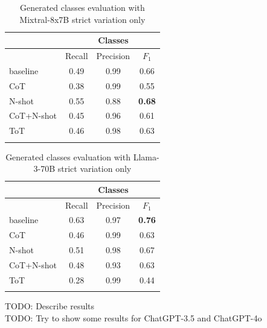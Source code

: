 \begin{table}[!h]
    \scriptsize
    \centering
    \setlength{\tabcolsep}{0.5em}
    \begin{tabular}{lccc}
    \toprule
         & & Classes & \\
     \toprule
         & Recall & Precision & $F_1$ \\
    \toprule
    
    \addlinespace
         baseline    & 0.49 & 0.99 & 0.66 \\
    	 CoT         & 0.38 & 0.99 & 0.55 \\
         N-shot      & 0.55 & 0.88 & \textbf{0.68} \\
         CoT+N-shot  & 0.45 & 0.96 & 0.61 \\
         ToT         & 0.46 & 0.98 & 0.63 \\
    \addlinespace
    \bottomrule
    \addlinespace
    \end{tabular}
    \caption{Generated classes evaluation with Mixtral-8x7B strict variation only}
    \label{tab:mixtral-classes}
\end{table}


\begin{table}[!h]
    \scriptsize
    \centering
    \setlength{\tabcolsep}{0.5em}
    \begin{tabular}{lccc}
    \toprule
    & & Classes & \\
    \toprule
         & Recall & Precision & $F_1$ \\
    \toprule
    
    \addlinespace
         baseline    & 0.63 & 0.97 & \textbf{0.76} \\
    	 CoT         & 0.46 & 0.99 & 0.63 \\
         N-shot      & 0.51 & 0.98 & 0.67 \\
         CoT+N-shot  & 0.48 & 0.93 & 0.63 \\
         ToT         & 0.28 & 0.99 & 0.44 \\
    \addlinespace
    \bottomrule
    \addlinespace
    \end{tabular}
    \caption{Generated classes evaluation with Llama-3-70B strict variation only}
    \label{tab:llama-classes}
\end{table}

\noindent{}TODO: Describe results \\

\noindent{}TODO: Try to show some results for ChatGPT-3.5 and ChatGPT-4o \\

